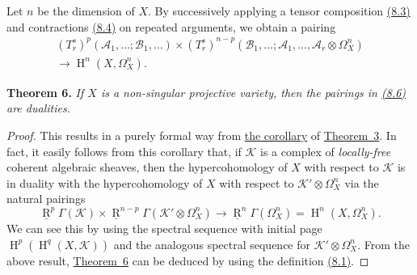 \documentclass{article}
\newenvironment{itenv}[1]
  {\phantomsection\par\medskip\noindent\textbf{#1.}\itshape}
  {\par\medskip}
\newcommand{\scr}[1]{{\mathscr{#1}}}
\DeclareMathOperator{\RR}{R}
\DeclareMathOperator{\HH}{H}
\begin{document}
Let $n$ be the dimension of $X$.
By successively applying a tensor composition \hyperref[8.3]{(8.3)} and contractions \hyperref[8.4]{(8.4)} on repeated arguments, we obtain a pairing
\[
\label{8.6}
  \begin{gathered}
    (T_r^s)^p(\scr{A}_1,\ldots;\scr{B}_1,\ldots)
    \times (T_r^s)^{n-p}(\scr{B}_1,\ldots;\scr{A}_1,\ldots,\scr{A}_r\otimes\Omega_X^n)
  \\\longrightarrow\HH^n(X,\Omega_X^n).
  \end{gathered}
\tag{8.6}
\]

\begin{itenv}{Theorem 6}
\label{theorem6}
  If $X$ is a non-singular projective variety, then the pairings in \hyperref[8.6]{(8.6)} are dualities.
\end{itenv}

\begin{proof}
  This results in a purely formal way from \hyperref[theorem3corollary]{the corollary} of \hyperref[theorem3]{Theorem~3}.
  In fact, it easily follows from this corollary that, if $\scr{K}$ is a complex of \emph{locally-free} coherent algebraic sheaves, then the hypercohomology of $X$ with respect to $\scr{K}$ is in duality with the hypercohomology of $X$ with respect to $\scr{K}'\otimes\Omega_X^n$ via the natural pairings
  \[
  \label{8.7}
    \underline{\RR}^p\Gamma(\scr{K})
    \times \underline{\RR}^{n-p}\Gamma(\scr{K}'\otimes\Omega_X^n)
    \to \underline{\RR}^n\Gamma(\Omega_X^n)
    = \HH^n(X,\Omega_X^n).
  \tag{8.7}
  \]
  We can see this by using the spectral sequence with initial page $\HH^p(\HH^q(X,\scr{K}))$ and the analogous spectral sequence for $\scr{K}'\otimes\Omega_X^n$.
  From the above result, \hyperref[theorem6]{Theorem~6} can be deduced by using the definition \hyperref[8.1]{(8.1)}.
\end{proof}
\end{document}
